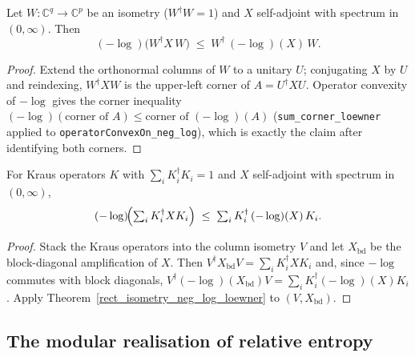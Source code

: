 \begin{theorem}\label{rect_isometry_neg_log_loewner}
  \leanok
  Let \(W:\mathbb{C}^q\to\mathbb{C}^p\) be an isometry (\(W^{\dagger}W=1\)) and \(X\) self-adjoint
  with spectrum in \((0,\infty)\). Then
  \[
    (-\log)\bigl(W^{\dagger}X\,W\bigr) \;\le\; W^{\dagger}\,(-\log)(X)\,W .
  \]
\end{theorem}
\begin{proof}\leanok
  Extend the orthonormal columns of \(W\) to a unitary \(U\); conjugating \(X\) by \(U\) and
  reindexing, \(W^{\dagger}XW\) is the upper-left corner of \(A=U^{\dagger}XU\). Operator convexity of
  \(-\log\) gives the corner inequality
  \((-\log)(\text{corner of }A)\le\text{corner of }(-\log)(A)\) (\texttt{sum\_corner\_loewner}
  applied to \texttt{operatorConvexOn\_neg\_log}), which is exactly the claim after identifying both
  corners.
\end{proof}

\begin{theorem}\label{choi-neg-log-loewner-math}
  For Kraus operators \(K\) with \(\sum_i K_i^{\dagger}K_i=1\) and \(X\) self-adjoint with spectrum
  in \((0,\infty)\),
  \[
    (-\log)\!\Bigl(\textstyle\sum_i K_i^{\dagger}X K_i\Bigr)
      \;\le\; \sum_i K_i^{\dagger}\,(-\log)(X)\,K_i .
  \]
\end{theorem}
\begin{proof}
  Stack the Kraus operators into the column isometry \(V\) and let
  \(X_{\mathrm{bd}}\) be the block-diagonal amplification of \(X\). Then
  \(V^{\dagger}X_{\mathrm{bd}}V=\sum_i K_i^{\dagger}XK_i\) and, since \(-\log\) commutes with block
  diagonals, \(V^{\dagger}(-\log)(X_{\mathrm{bd}})V=\sum_i K_i^{\dagger}(-\log)(X)K_i\). Apply
  Theorem~\ref{rect_isometry_neg_log_loewner} to \((V,X_{\mathrm{bd}})\).
\end{proof}

\subsection{The modular realisation of relative entropy}

